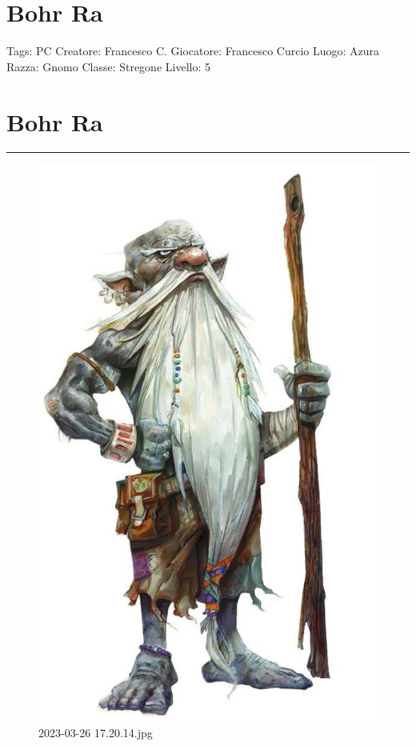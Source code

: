 \section{Bohr Ra}\label{bohr-ra}

Tags: PC Creatore: Francesco C. Giocatore: Francesco Curcio Luogo: Azura
Razza: Gnomo Classe: Stregone Livello: 5

\section{Bohr Ra}\label{bohr-ra-1}

\begin{center}\rule{0.5\linewidth}{0.5pt}\end{center}

\begin{figure}
\centering
\includegraphics{2023-03-26_17.20.14.jpg}
\caption{2023-03-26 17.20.14.jpg}
\end{figure}

